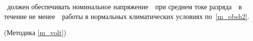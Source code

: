 \dut \ должен обеспечивать номинальное напряжение~\volt \ при среднем токе разряда~\current \ в течение не менее~\work \ работы в нормальных климатических условиях по~\ref{m_obsh2}.

\begin{flushright}
	(Методика \ref{m_volt})
\end{flushright}